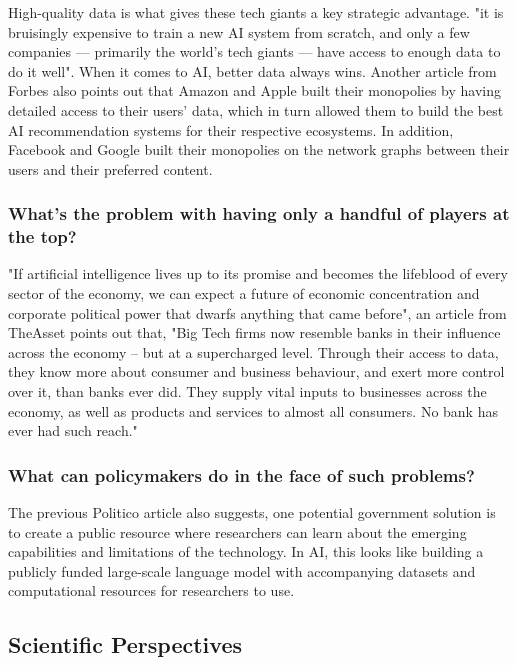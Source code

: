 \documentclass[11pt]{article}
\begin{document}
High-quality data is what gives these tech giants a key strategic advantage. "it is bruisingly expensive to train a new AI system from scratch, and only a few companies — primarily the world’s tech giants — have access to enough data to do it well"\cite{Chatterjee2023}. When it comes to AI, better data always wins. Another  article from Forbes also points out that Amazon and Apple built their monopolies by having detailed access to their users’ data, which in turn allowed them to build the best AI recommendation systems for their respective ecosystems. In addition, Facebook and Google built their monopolies on the network graphs between their users and their preferred content. \cite{Stacey2020}


\subsubsection{What's the problem with having only a handful of players at the top?}

"If artificial intelligence lives up to its promise and becomes the lifeblood of every sector of the economy, we can expect a future of economic concentration and corporate political power that dwarfs anything that came before", an article from TheAsset points out that,  "Big Tech firms now resemble banks in their influence across the economy – but at a supercharged level. Through their access to data, they know more about consumer and business behaviour, and exert more control over it, than banks ever did. They supply vital inputs to businesses across the economy, as well as products and services to almost all consumers. No bank has ever had such reach."\cite{Posner2024}

\subsubsection{What can policymakers do in the face of such problems?}

The previous Politico article \cite{Chatterjee2023} also suggests, one potential government solution is to create a public resource where researchers can learn about the emerging capabilities and limitations of the technology. In AI, this looks like building a publicly funded large-scale language model with accompanying datasets and computational resources for researchers to use.

\subsection{Scientific Perspectives}
\end{document}
